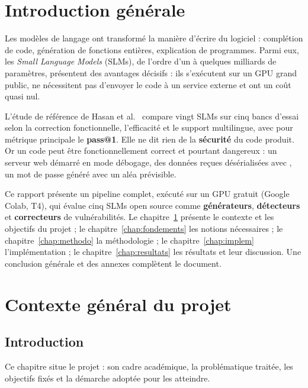 \documentclass[11pt,a4paper,oneside]{report}
\newcommand{\code}[1]{\texttt{\detokenize{#1}}}
\newcommand{\chapintro}{\section*{Introduction}}
\begin{document}
\cleardoublepage
{}
\listoffigures
\cleardoublepage
{}
\listoftables
\cleardoublepage
{}
\lstlistoflistings
\cleardoublepage
\tableofcontents

\cleardoublepage
{}
\setcounter{page}{1}

\chapter*{Introduction générale}
Les modèles de langage ont transformé la manière d'écrire du logiciel : complétion de code, génération de fonctions entières, explication de programmes. Parmi eux, les \emph{Small Language Models} (SLMs), de l'ordre d'un à quelques milliards de paramètres, présentent des avantages décisifs : ils s'exécutent sur un GPU grand public, ne nécessitent pas d'envoyer le code à un service externe et ont un coût quasi nul.

L'étude de référence de Hasan et al.~\cite{hasan} compare vingt SLMs sur cinq bancs d'essai selon la correction fonctionnelle, l'efficacité et le support multilingue, avec pour métrique principale le \textbf{pass@1}. Elle ne dit rien de la \textbf{sécurité} du code produit. Or un code peut être fonctionnellement correct et pourtant dangereux : un serveur web démarré en mode débogage, des données reçues désérialisées avec \code{pickle}, un mot de passe généré avec un aléa prévisible.

Ce rapport présente un pipeline complet, exécuté sur un GPU gratuit (Google Colab, T4), qui évalue cinq SLMs open source comme \textbf{générateurs}, \textbf{détecteurs} et \textbf{correcteurs} de vulnérabilités. Le chapitre~\ref{chap:contexte} présente le contexte et les objectifs du projet ; le chapitre~\ref{chap:fondements} les notions nécessaires ; le chapitre~\ref{chap:methodo} la méthodologie ; le chapitre~\ref{chap:implem} l'implémentation ; le chapitre~\ref{chap:resultats} les résultats et leur discussion. Une conclusion générale et des annexes complètent le document.

\chapter{Contexte général du projet}\label{chap:contexte}
\chapintro
Ce chapitre situe le projet : son cadre académique, la problématique traitée, les objectifs fixés et la démarche adoptée pour les atteindre.
\end{document}

